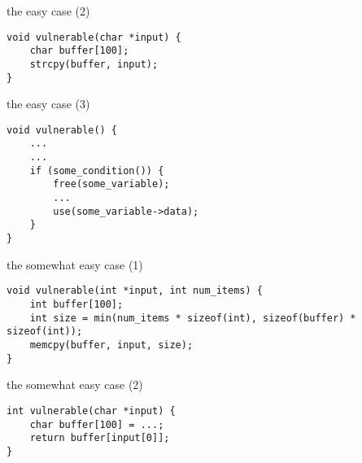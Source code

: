 \begin{frame}[fragile,label=easyCase2]{the easy case (2)}
    \lstset{language=C,style=small}
\begin{lstlisting}
void vulnerable(char *input) {
    char buffer[100];
    strcpy(buffer, input);
}
\end{lstlisting}
\end{frame}

\begin{frame}[fragile,label=easyCase3]{the easy case (3)}
    \lstset{language=C,style=small}
\begin{lstlisting}
void vulnerable() {
    ...
    ...
    if (some_condition()) {
        free(some_variable);
        ...
        use(some_variable->data);
    }
}
\end{lstlisting}
\end{frame}


\begin{frame}[fragile,label=easyCaseS1]{the somewhat easy case (1)}
    \lstset{language=C,style=small}
\begin{lstlisting}
void vulnerable(int *input, int num_items) {
    int buffer[100];
    int size = min(num_items * sizeof(int), sizeof(buffer) * sizeof(int));
    memcpy(buffer, input, size);
}
\end{lstlisting}
\end{frame}

\begin{frame}[fragile,label=easyCaseS2]{the somewhat easy case (2)}
\begin{lstlisting}
int vulnerable(char *input) {
    char buffer[100] = ...;
    return buffer[input[0]];
}
\end{lstlisting}
\end{frame}

